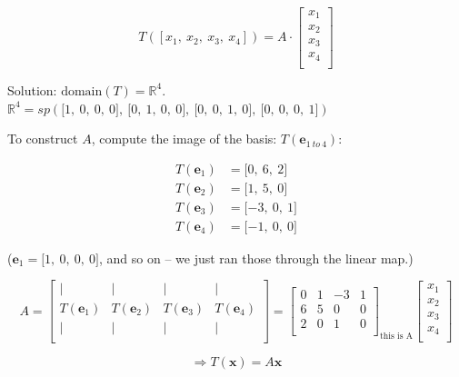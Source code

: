 \documentclass[
]{article}
\begin{document}
$$T\left( \left\lbrack x_{1},\ x_{2},\ x_{3},\ x_{4} \right\rbrack \right) = A \cdot \begin{bmatrix}
x_{1} \\
x_{2} \\
x_{3} \\
x_{4} \\
\end{bmatrix}$$

Solution: $\text{domain}(T) = \mathbb{R}^{4}$.
$\mathbb{R}^{4} = sp\left( \lbrack 1,\ 0,\ 0,\ 0\rbrack,\ \lbrack 0,\ 1,\ 0,\ 0\rbrack,\ \lbrack 0,\ 0,\ 1,\ 0\rbrack,\ \lbrack 0,\ 0,\ 0,\ 1\rbrack \right)$

To construct $A$, compute the image of the basis:
$T({\mathbf{e}}_{1\ to\ 4})$:

\begin{align*}
T\left( {\mathbf{e}}_{1} \right) &= \lbrack 0,\ 6,\ 2\rbrack
 \\
T\left( {\mathbf{e}}_{2} \right) &= \lbrack 1,\ 5,\ 0\rbrack
 \\
T\left( {\mathbf{e}}_{3} \right) &= \lbrack - 3,\ 0,\ 1\rbrack
 \\
T\left( {\mathbf{e}}_{4} \right) &= \lbrack - 1,\ 0,\ 0\rbrack
\end{align*}


(${\mathbf{e}}_{1} = \lbrack 1,\ 0,\ 0,\ 0\rbrack$, and so on --
we just ran those through the linear map.)

$$A = \begin{bmatrix}
 \mid & \mid & \mid & \mid \\
T\left( {\mathbf{e}}_{1} \right) & T\left( {\mathbf{e}}_{2} \right) & T\left( {\mathbf{e}}_{3} \right) & T\left( {\mathbf{e}}_{4} \right) \\
 \mid & \mid & \mid & \mid \\
\end{bmatrix} = \begin{bmatrix}
0 & 1 & - 3 & 1 \\
6 & 5 & 0 & 0 \\
2 & 0 & 1 & 0 \\
\end{bmatrix}_{\text{this\ is\ A}}\begin{bmatrix}
x_{1} \\
x_{2} \\
x_{3} \\
x_{4} \\
\end{bmatrix}$$

$$\Rightarrow T\left( \mathbf{x} \right) = A\mathbf{x}$$
\end{document}
